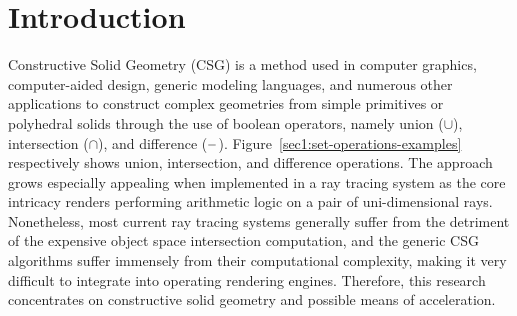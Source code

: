 \documentclass[a4paper,11pt,oneside]{article}
\newcommand{\minus}{\scalebox{0.9}[1.0]{$-$}} %
\begin{document}
\section{Introduction}
  
Constructive Solid Geometry (CSG) is a method used in computer graphics, computer-aided design, generic modeling languages, and numerous other applications to construct complex geometries from simple primitives or polyhedral solids through the use of boolean operators, namely union ($\cup$),  intersection ($\cap$), and difference ($\minus$). Figure~\ref{sec1:set-operations-examples} respectively shows union, intersection, and difference operations. The approach grows especially appealing when implemented in a ray tracing system as the core intricacy renders performing arithmetic logic on a pair of uni-dimensional rays. Nonetheless, most current ray tracing systems generally suffer from the detriment of the expensive object space intersection computation, and the generic CSG algorithms suffer immensely from their computational complexity, making it very difficult to integrate into operating rendering engines. Therefore, this research concentrates on constructive solid geometry and possible means of acceleration.
  
\end{document}
